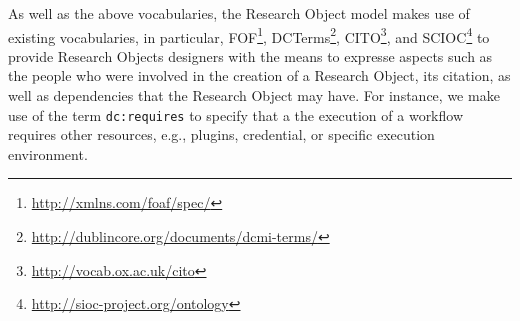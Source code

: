As well as the above vocabularies, the Research Object model makes use of existing vocabularies, in particular, FOF\footnote{\url{http://xmlns.com/foaf/spec/}}, DCTerms\footnote{\url{http://dublincore.org/documents/dcmi-terms/}}, CITO\footnote{\url{http://vocab.ox.ac.uk/cito}}, and SCIOC\footnote{\url{http://sioc-project.org/ontology}} to provide Research Objects designers with the means to expresse aspects such as the people who were involved in the creation of a Research Object, its citation, as well as dependencies that the Research Object may have. For instance, we make use of the term \texttt{dc:requires} to specify that a the execution of a workflow requires other resources, e.g., plugins, credential, or specific execution environment.
